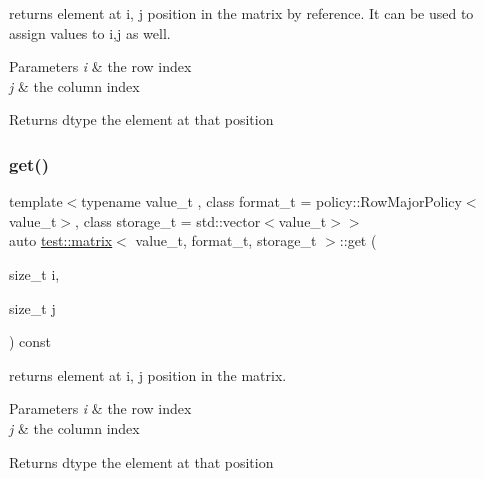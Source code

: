 returns element at i, j position in the matrix by reference. It can be used to assign values to i,j as well. 


\begin{DoxyParams}{Parameters}
{\em i} & the row index \\
\hline
{\em j} & the column index \\
\hline
\end{DoxyParams}
\begin{DoxyReturn}{Returns}
dtype the element at that position 
\end{DoxyReturn}
\mbox{\label{classtest_1_1matrix_a29885efc9b15c38610a6595f5aa18c19}} 
\subsubsection{\texorpdfstring{get()}{get()}\hspace{0.1cm}{\footnotesize\ttfamily [4/4]}}
{\footnotesize\ttfamily template$<$typename value\+\_\+t , class format\+\_\+t  = policy\+::\+Row\+Major\+Policy$<$value\+\_\+t$>$, class storage\+\_\+t  = std\+::vector$<$value\+\_\+t$>$$>$ \\
auto \mbox{\hyperlink{classtest_1_1matrix}{test\+::matrix}}$<$ value\+\_\+t, format\+\_\+t, storage\+\_\+t $>$\+::get (\begin{DoxyParamCaption}\item[{size\+\_\+t}]{i,  }\item[{size\+\_\+t}]{j }\end{DoxyParamCaption}) const\hspace{0.3cm}{\ttfamily [inline]}}



returns element at i, j position in the matrix. 


\begin{DoxyParams}{Parameters}
{\em i} & the row index \\
\hline
{\em j} & the column index \\
\hline
\end{DoxyParams}
\begin{DoxyReturn}{Returns}
dtype the element at that position 
\end{DoxyReturn}
\mbox{\label{classtest_1_1matrix_ad441a590a304dabb40950e5dfaee698a}} 
